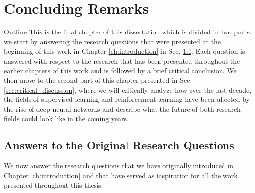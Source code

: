 
\chapter{Concluding Remarks} %
\label{ch:upside_down_rl} %

\begin{remark}{Outline}
This is the final chapter of this dissertation which is divided in two parts: we start by answering the research questions that were presented at the beginning of this work in Chapter \ref{ch:introduction} in Sec. \ref{sec:answers}. Each question is answered with respect to the research that has been presented throughout the earlier chapters of this work and is followed by a brief critical conclusion. We then move to the second part of this chapter presented in Sec. \ref{sec:critical_discussion}, where we will critically analyze how over the last decade, the fields of supervised learning and reinforcement learning have been affected by the rise of deep neural networks and describe what the future of both research fields could look like in the coming years. 
\end{remark}


\section{Answers to the Original Research Questions}
\label{sec:answers}

We now answer the research questions that we have originally introduced in Chapter \ref{ch:introduction} and that have served as inspiration for all the work presented throughout this thesis.

